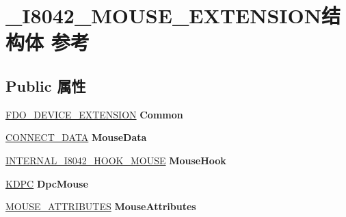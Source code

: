\hypertarget{struct___i8042___m_o_u_s_e___e_x_t_e_n_s_i_o_n}{}\section{\+\_\+\+I8042\+\_\+\+M\+O\+U\+S\+E\+\_\+\+E\+X\+T\+E\+N\+S\+I\+O\+N结构体 参考}
\label{struct___i8042___m_o_u_s_e___e_x_t_e_n_s_i_o_n}
\subsection*{Public 属性}
\begin{DoxyCompactItemize}
\item 
\mbox{\label{struct___i8042___m_o_u_s_e___e_x_t_e_n_s_i_o_n_a235de3bfcb636d0d73b87f3978e6ed09}} 
\hyperlink{struct_f_d_o___d_e_v_i_c_e___e_x_t_e_n_s_i_o_n}{F\+D\+O\+\_\+\+D\+E\+V\+I\+C\+E\+\_\+\+E\+X\+T\+E\+N\+S\+I\+ON} {\bfseries Common}
\item 
\mbox{\label{struct___i8042___m_o_u_s_e___e_x_t_e_n_s_i_o_n_acd33c1857f30c372c1b1632ebcbcacdc}} 
\hyperlink{struct___c_o_n_n_e_c_t___d_a_t_a}{C\+O\+N\+N\+E\+C\+T\+\_\+\+D\+A\+TA} {\bfseries Mouse\+Data}
\item 
\mbox{\label{struct___i8042___m_o_u_s_e___e_x_t_e_n_s_i_o_n_ad3f2a5dfdcad479b02a61664e68bd6d4}} 
\hyperlink{struct___i_n_t_e_r_n_a_l___i8042___h_o_o_k___m_o_u_s_e}{I\+N\+T\+E\+R\+N\+A\+L\+\_\+\+I8042\+\_\+\+H\+O\+O\+K\+\_\+\+M\+O\+U\+SE} {\bfseries Mouse\+Hook}
\item 
\mbox{\label{struct___i8042___m_o_u_s_e___e_x_t_e_n_s_i_o_n_a6891609fb16d7db5582ff2f9dfafe1d8}} 
\hyperlink{struct___k_d_p_c}{K\+D\+PC} {\bfseries Dpc\+Mouse}
\item 
\mbox{\label{struct___i8042___m_o_u_s_e___e_x_t_e_n_s_i_o_n_a33bf79704ccde0cfdcfdab889bc7045a}} 
\hyperlink{struct___m_o_u_s_e___a_t_t_r_i_b_u_t_e_s}{M\+O\+U\+S\+E\+\_\+\+A\+T\+T\+R\+I\+B\+U\+T\+ES} {\bfseries Mouse\+Attributes}
\item 

\end{DoxyCompactItemize}
